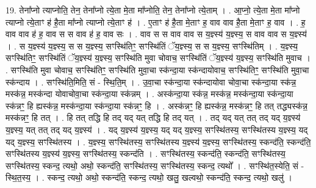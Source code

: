 \documentclass[17pt]{extarticle}
\begin{document}
19. तेना᳚प्नो त्याप्नोति॒ तेन॒ तेना᳚प्नो त्ये॒ता मे॒ता मा᳚प्नोति॒ तेन॒ तेना᳚प्नो त्ये॒ताम् । . आ॒प्नो॒ त्ये॒ता मे॒ता मा᳚प्नो त्याप्नो त्ये॒ताꣳ ह॑ है॒ता मा᳚प्नो त्याप्नो त्ये॒ताꣳ ह॑ । . ए॒ताꣳ ह॑ है॒ता मे॒ताꣳ ह॒ वाव वाव है॒ता मे॒ताꣳ ह॒ वाव । . ह॒ वाव वाव ह॑ ह॒ वाव स स वाव ह॑ ह॒ वाव सः । . वाव स स वाव वाव स य॒ज्ञ्स्य॑ य॒ज्ञ्स्य॒ स वाव वाव स य॒ज्ञ्स्य॑ । . स य॒ज्ञ्स्य॑ य॒ज्ञ्स्य॒ स स य॒ज्ञ्स्य॒ सꣳस्थि॑तिꣳ॒॒ सꣳस्थि॑तिं ॅय॒ज्ञ्स्य॒ स स य॒ज्ञ्स्य॒ सꣳस्थि॑तिम् । . य॒ज्ञ्स्य॒ सꣳस्थि॑तिꣳ॒॒ सꣳस्थि॑तिं ॅय॒ज्ञ्स्य॑ य॒ज्ञ्स्य॒ सꣳस्थि॑ति मुवा चोवाच॒ सꣳस्थि॑तिं ॅय॒ज्ञ्स्य॑ य॒ज्ञ्स्य॒ सꣳस्थि॑ति मुवाच । . सꣳस्थि॑ति मुवा चोवाच॒ सꣳस्थि॑तिꣳ॒॒ सꣳस्थि॑ति मुवा॒चा स्क॑न्दा॒या स्क॑न्दायोवाच॒ सꣳस्थि॑तिꣳ॒॒ सꣳस्थि॑ति मुवा॒चा स्क॑न्दाय । . सꣳस्थि॑ति॒मिति॒ सं - स्थि॒ति॒म् । . उ॒वा॒चा स्क॑न्दा॒या स्क॑न्दायोवा चोवा॒चा स्क॑न्दा॒या स्क॑न्न॒ मस्क॑न्न॒ मस्क॑न्दा योवाचोवा॒चा स्क॑न्दा॒या स्क॑न्नम् । . अस्क॑न्दा॒या स्क॑न्न॒ मस्क॑न्न॒ मस्क॑न्दा॒या स्क॑न्दा॒या स्क॑न्नꣳ॒॒ हि ह्यस्क॑न्न॒ मस्क॑न्दा॒या स्क॑न्दा॒या स्क॑न्नꣳ॒॒ हि । . अस्क॑न्नꣳ॒॒ हि ह्यस्क॑न्न॒ मस्क॑न्नꣳ॒॒ हि तत् तद्ध्यस्क॑न्न॒ मस्क॑न्नꣳ॒॒ हि तत् । . हि तत् तद्धि हि तद् यद् यत् तद्धि हि तद् यत् । . तद् यद् यत् तत् तद् यद् य॒ज्ञ्स्य॑ य॒ज्ञ्स्य॒ यत् तत् तद् यद् य॒ज्ञ्स्य॑ । . यद् य॒ज्ञ्स्य॑ य॒ज्ञ्स्य॒ यद् यद् य॒ज्ञ्स्य॒ सꣳस्थि॑तस्य॒ सꣳस्थि॑तस्य य॒ज्ञ्स्य॒ यद् यद् य॒ज्ञ्स्य॒ सꣳस्थि॑तस्य । . य॒ज्ञ्स्य॒ सꣳस्थि॑तस्य॒ सꣳस्थि॑तस्य य॒ज्ञ्स्य॑ य॒ज्ञ्स्य॒ सꣳस्थि॑तस्य॒ स्कन्द॑ति॒ स्कन्द॑ति॒ सꣳस्थि॑तस्य य॒ज्ञ्स्य॑ य॒ज्ञ्स्य॒ सꣳस्थि॑तस्य॒ स्कन्द॑ति । . सꣳस्थि॑तस्य॒ स्कन्द॑ति॒ स्कन्द॑ति॒ सꣳस्थि॑तस्य॒ सꣳस्थि॑तस्य॒ स्कन्द॒ त्यथो॒ अथो॒ स्कन्द॑ति॒ सꣳस्थि॑तस्य॒ सꣳस्थि॑तस्य॒ स्कन्द॒ त्यथो᳚ । . सꣳस्थि॑त॒स्येति॒ सं - स्थि॒त॒स्य॒ । . स्कन्द॒ त्यथो॒ अथो॒ स्कन्द॑ति॒ स्कन्द॒ त्यथो॒ खलु॒ खल्वथो॒ स्कन्द॑ति॒ स्कन्द॒ त्यथो॒ खलु॑ । \newline
\end{document}
